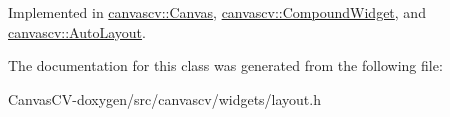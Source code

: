 Implemented in \hyperlink{classcanvascv_1_1Canvas_a70248a9be2eedcacad74c9be5fd615eb}{canvascv\+::\+Canvas}, \hyperlink{classcanvascv_1_1CompoundWidget_ad4a37bf31f9cf6410b41526a5b83c75a}{canvascv\+::\+Compound\+Widget}, and \hyperlink{classcanvascv_1_1AutoLayout_abc436c90f50a5331c391e351bef9e659}{canvascv\+::\+Auto\+Layout}.



The documentation for this class was generated from the following file\+:\begin{DoxyCompactItemize}
\item 
Canvas\+C\+V-\/doxygen/src/canvascv/widgets/layout.\+h\end{DoxyCompactItemize}
